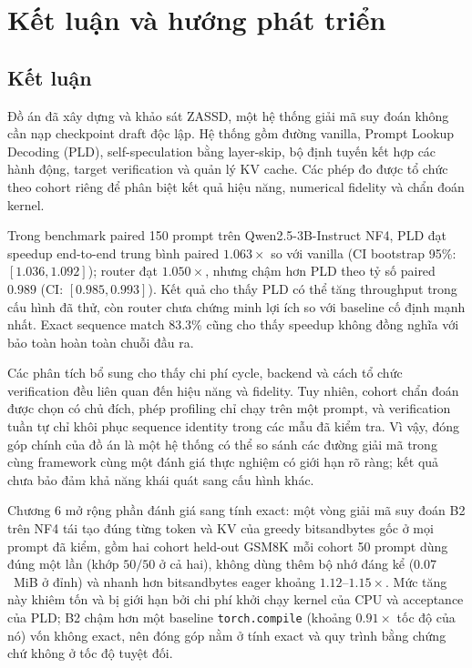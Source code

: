 \chapter{Kết luận và hướng phát triển}

\section{Kết luận}

Đồ án đã xây dựng và khảo sát ZASSD, một hệ thống giải mã suy đoán không cần nạp checkpoint draft độc lập. Hệ thống gồm đường vanilla, Prompt Lookup Decoding (PLD), self-speculation bằng layer-skip, bộ định tuyến kết hợp các hành động, target verification và quản lý KV cache. Các phép đo được tổ chức theo cohort riêng để phân biệt kết quả hiệu năng, numerical fidelity và chẩn đoán kernel.

Trong benchmark paired 150 prompt trên Qwen2.5-3B-Instruct NF4, PLD đạt speedup end-to-end trung bình paired \(1.063\times\) so với vanilla (CI bootstrap 95\%: \([1.036,1.092]\)); router đạt \(1.050\times\), nhưng chậm hơn PLD theo tỷ số paired \(0.989\) (CI: \([0.985,0.993]\)). Kết quả cho thấy PLD có thể tăng throughput trong cấu hình đã thử, còn router chưa chứng minh lợi ích so với baseline cố định mạnh nhất. Exact sequence match 83.3\% cũng cho thấy speedup không đồng nghĩa với bảo toàn hoàn toàn chuỗi đầu ra.

Các phân tích bổ sung cho thấy chi phí cycle, backend và cách tổ chức verification đều liên quan đến hiệu năng và fidelity. Tuy nhiên, cohort chẩn đoán được chọn có chủ đích, phép profiling chỉ chạy trên một prompt, và verification tuần tự chỉ khôi phục sequence identity trong các mẫu đã kiểm tra. Vì vậy, đóng góp chính của đồ án là một hệ thống có thể so sánh các đường giải mã trong cùng framework cùng một đánh giá thực nghiệm có giới hạn rõ ràng; kết quả chưa bảo đảm khả năng khái quát sang cấu hình khác.

Chương 6 mở rộng phần đánh giá sang tính exact: một vòng giải mã suy đoán B2 trên NF4 tái tạo đúng từng token và KV của greedy bitsandbytes gốc ở mọi prompt đã kiểm, gồm hai cohort held-out GSM8K mỗi cohort 50 prompt dùng đúng một lần (khớp $50/50$ ở cả hai), không dùng thêm bộ nhớ đáng kể ($0.07$~MiB ở đỉnh) và nhanh hơn bitsandbytes eager khoảng $1.12$--$1.15\times$. Mức tăng này khiêm tốn và bị giới hạn bởi chi phí khởi chạy kernel của CPU và acceptance của PLD; B2 chậm hơn một baseline \texttt{torch.compile} (khoảng $0.91\times$ tốc độ của nó) vốn không exact, nên đóng góp nằm ở tính exact và quy trình bằng chứng chứ không ở tốc độ tuyệt đối.

